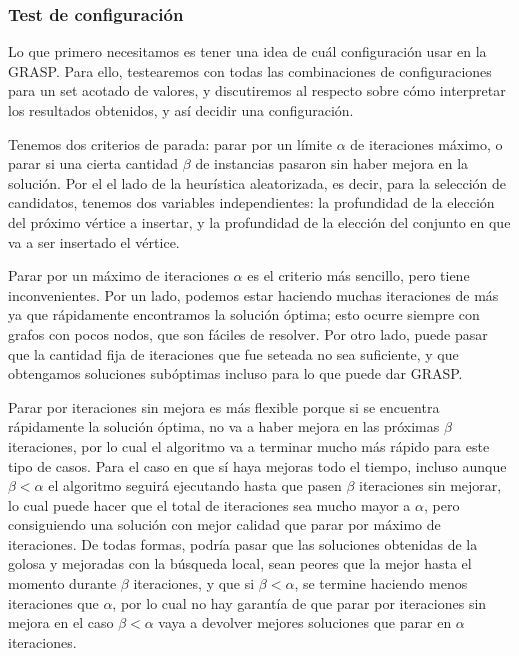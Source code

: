 \subsubsection{Test de configuración}

Lo que primero necesitamos es tener una idea de cuál configuración usar en la GRASP. Para ello, testearemos con todas las combinaciones de configuraciones para un set acotado de valores, y discutiremos al respecto sobre cómo interpretar los resultados obtenidos, y así decidir una configuración.

Tenemos dos criterios de parada: parar por un límite $\alpha$ de iteraciones máximo, o parar si una cierta cantidad $\beta$ de instancias pasaron sin haber mejora en la solución. Por el el lado de la heurística aleatorizada, es decir, para la selección de candidatos, tenemos dos variables independientes: la profundidad de la elección del próximo vértice a insertar, y la profundidad de la elección del conjunto en que va a ser insertado el vértice.

Parar por un máximo de iteraciones $\alpha$ es el criterio más sencillo, pero tiene inconvenientes. Por un lado, podemos estar haciendo muchas iteraciones de más ya que rápidamente encontramos la solución óptima; esto ocurre siempre con grafos con pocos nodos, que son fáciles de resolver. Por otro lado, puede pasar que la cantidad fija de iteraciones que fue seteada no sea suficiente, y que obtengamos soluciones subóptimas incluso para lo que puede dar GRASP.

Parar por iteraciones sin mejora es más flexible porque si se encuentra rápidamente la solución óptima, no va a haber mejora en las próximas $\beta$ iteraciones, por lo cual el algoritmo va a terminar mucho más rápido para este tipo de casos. Para el caso en que sí haya mejoras todo el tiempo, incluso aunque $\beta < \alpha$ el algoritmo seguirá ejecutando hasta que pasen $\beta$ iteraciones sin mejorar, lo cual puede hacer que el total de iteraciones sea mucho mayor a $\alpha$, pero consiguiendo una solución con mejor calidad que parar por máximo de iteraciones. De todas formas, podría pasar que las soluciones obtenidas de la golosa y mejoradas con la búsqueda local, sean peores que la mejor hasta el momento durante $\beta$ iteraciones, y que si $\beta < \alpha$, se termine haciendo menos iteraciones que $\alpha$, por lo cual no hay garantía de que parar por iteraciones sin mejora en el caso $\beta < \alpha$ vaya a devolver mejores soluciones que parar en $\alpha$ iteraciones.

